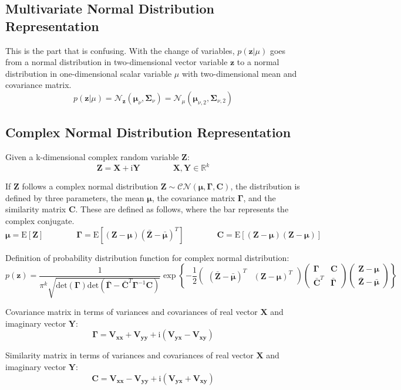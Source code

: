 \documentclass{article}         %
\theoremstyle{definition}
\theoremstyle{remark}
\newcommand{\eq}[1]{\begin{equation} #1 \end{equation}}
\newcommand{\R}{\mathbb{R}}
\newcommand{\Xbf}{\mathbf{X}}
\newcommand{\Ybf}{\mathbf{Y}}
\newcommand{\zbf}{\mathbf{z}}
\newcommand{\Zbf}{\mathbf{Z}}
\newcommand{\mubf}{\boldsymbol{\mu}}
\newcommand{\Gammabf}{\mathbf{\Gamma}}
\newcommand{\Cbf}{\mathbf{C}}
\newcommand{\Sigmabf}{\boldsymbol{\Sigma}}
\newcommand{\zcond}{\mathbf{z}|\mu}
\newcommand{\Nscript}{\mathcal{N}}
\newcommand{\CNscript}{\mathcal{CN}}
\newcommand{\im}{\mathrm{i}}
\newcommand{\paren}[1]{\left(#1\right)}
\newcommand{\expect}[1]{\mathrm{E}\left[#1\right]}
\newcommand{\qq}{\qquad\qquad}
\newcommand{\CNpdf}[5]{\frac{1}{\pi^{#1}\sqrt{\mathrm{det}\paren{#4}\mathrm{det}\paren{\bar{#4} - \bar{#5}^T#4^{-1}#5}}} \exp\left\{-\frac{1}{2} \paren{\begin{array}{cc}\paren{\bar{#2} - \bar{#3}}^T & \paren{#2 - #3}^T\end{array}} \paren{\begin{array}{cc} #4 & #5 \\ \bar{#5}^T & \bar{#4} \end{array}}\paren{\begin{array}{c} #2 - #3 \\ \bar{#2} - \bar{#3} \end{array}}\right\}}
\begin{document}
\subsection{Multivariate Normal Distribution Representation}

This is the part that is confusing. With the change of variables, $p\paren{\zcond}$ goes from a normal distribution in two-dimensional vector variable $\zbf$ to a normal distribution in one-dimensional scalar variable $\mu$ with two-dimensional mean and covariance matrix.
\eq{p\paren{\zcond} = \Nscript_\zbf\paren{\mubf_\nu,\Sigmabf_\nu} = \Nscript_\mu\paren{\mubf_{\nu,2},\Sigmabf_{\nu,2}}}

\subsection{Complex Normal Distribution Representation}

Given a k-dimensional complex random variable $\Zbf$:
\begin{equation}
	\Zbf = \Xbf + \im\Ybf
	\qq \Xbf,\Ybf\in\R^k
\end{equation}

If $\Zbf$ follows a complex normal distribution $\Zbf\sim\CNscript\paren{\mubf,\Gammabf,\Cbf}$, the distribution is defined by three parameters, the mean $\mubf$, the covariance matrix $\Gammabf$, and the similarity matrix $\Cbf$. These are defined as follows, where the bar represents the complex conjugate.
\begin{equation}
	\mubf = \expect{\Zbf}
	\qq \Gammabf = \expect{\paren{\Zbf - \mubf}\paren{\bar{\Zbf} - \bar{\mubf}}^T}
	\qq \Cbf = \expect{\paren{\Zbf - \mubf}\paren{\Zbf - \mubf}}
\end{equation}

Definition of probability distribution function for complex normal distribution:
\begin{equation}
	p\paren{\zbf} = \CNpdf{k}{\Zbf}{\mubf}{\Gammabf}{\Cbf}
\end{equation}

Covariance matrix in terms of variances and covariances of real vector $\Xbf$ and imaginary vector $\Ybf$:
\eq{\Gammabf = \mathbf{V_{xx}} + \mathbf{V_{yy}} + \im\paren{\mathbf{V_{yx}} - \mathbf{V_{xy}}}}

Similarity matrix in terms of variances and covariances of real vector $\Xbf$ and imaginary vector $\Ybf$:
\eq{\Cbf = \mathbf{V_{xx}} - \mathbf{V_{yy}} + \im\paren{\mathbf{V_{yx}} + \mathbf{V_{xy}}}}
\end{document}
